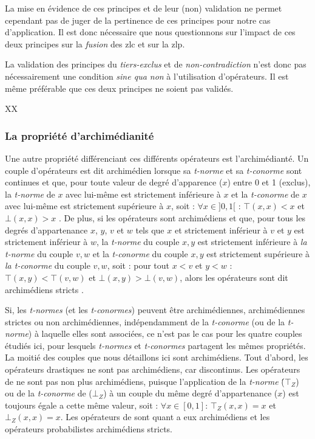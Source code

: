 La mise en évidence de ces principes et de leur (non) validation ne
permet cependant pas de juger de la pertinence de ces principes pour
notre cas d’application. Il est donc nécessaire que nous questionnons
sur l'impact de ces deux principes sur la \emph{fusion} des \ac{zlc}
et sur la \ac{zlp}.




La validation des principes du \emph{tiers-exclus} et de
\emph{non-contradiction} n'est donc pas nécessairement une condition
\emph{sine qua non} à l'utilisation d'opérateurs. Il est même
préférable que ces deux principes ne soient pas validés.

XX


\subsubsection{La propriété d'archimédianité}

Une autre propriété différenciant ces différents opérateurs est
l'archimédianté. Un couple d'opérateurs est dit archimédien lorsque sa
\emph{t-norme} et sa \emph{t-conorme} sont continues et que, pour
toute valeur de degré d’apparence (\(x\)) entre 0 et 1 (exclus), la
\emph{t-norme} de \(x\) avec lui-même est strictement inférieure à
\(x\) et la \emph{t-conorme} de \(x\) avec lui-même est strictement
supérieure à \(x\), soit : \(\forall x \in ]0,1[\) : \(⊤(x,x) < x\) et
\(⊥(x,x) > x\) \autocite{Bouchon-Meunier1995}. De plus, si les
opérateurs sont archimédiens et que, pour tous les degrés
d'appartenance \(x\), \(y\), \(v\) et \(w\) tels que \(x\) et
strictement inférieur à \(v\) et \(y\) est strictement inférieur à
\(w\), la \emph{t-norme} du couple \(x,y\) est strictement inférieure
à \emph{la t-norme} du couple \(v, w\) et la \emph{t-conorme} du
couple \(x,y\) est strictement supérieure à \emph{la t-conorme} du
couple \(v, w\), soit : pour tout \(x < v\) et \(y < w\) :
\(⊤(x,y) < ⊤(v,w)\) et \(⊥(x,y) > ⊥(v,w)\), alors les opérateurs sont
dit archimédiens stricts \autocite{Bouchon-Meunier1995}.

Si, les \emph{t-normes} (et les \emph{t-conormes}) peuvent être
archimédiennes, archimédiennes strictes ou non archimédiennes,
indépendamment de la \emph{t-conorme} (ou de la \emph{t-norme}) à
laquelle elles sont associées, ce n'est pas le cas pour les quatre
couples étudiés ici, pour lesquels \emph{t-normes} et
\emph{t-conormes} partagent les mêmes propriétés. La moitié des
couples que nous détaillons ici sont archimédiens. Tout d'abord, les
opérateurs drastiques ne sont pas archimédiens, car discontinus. Les
opérateurs de \textcite{Zadeh1965} ne sont pas non plus archimédiens,
puisque l’application de la \emph{t-norme} (́\(⊤_Z\)) ou de la
\emph{t-conorme} de  (\(⊥_Z\)) à un couple du même degré
d'appartenance (\(x\)) est toujours égale a cette même valeur, soit :
\(∀ x ∈ [0,1]\): \(⊤_Z(x,x) = x\) et \(⊥_Z(x,x) = x\).
%
Les opérateurs de  sont quant a eux archimédiens et
les opérateurs probabilistes archimédiens stricts.

